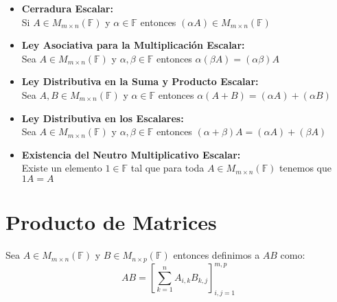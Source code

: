 \documentclass[12pt]{report}                                    %
\newcommand{\Brackets}[1]{\left[ #1 \right]}                    %
\begin{document}
                \begin{itemize}

                    \item \textbf{Cerradura Escalar:}\\
                        Si $A\in M_{m \times n}(\mathbb{F})$ y $\alpha \in \mathbb{F}$ entonces 
                        $(\alpha A) \in M_{m \times n}(\mathbb{F})$

                    \item \textbf{Ley Asociativa para la Multiplicación Escalar:}\\
                        Sea $A \in M_{m \times n}(\mathbb{F})$ y $\alpha, \beta \in \mathbb{F}$
                        entonces $\alpha(\beta A) = (\alpha \beta)A$

                    \item \textbf{Ley Distributiva en la Suma y Producto Escalar:}\\
                        Sea $A, B \in M_{m \times n}(\mathbb{F})$ y $\alpha \in \mathbb{F}$
                        entonces $\alpha(A + B) = (\alpha A) + (\alpha B)$

                    \item \textbf{Ley Distributiva en los Escalares:}\\
                        Sea $A \in M_{m \times n}(\mathbb{F})$ y $\alpha, \beta \in \mathbb{F}$
                        entonces $(\alpha + \beta)A = (\alpha A) + (\beta A)$

                    \item \textbf{Existencia del Neutro Multiplicativo Escalar:}\\
                        Existe un elemento $1 \in \mathbb{F}$ tal que para toda
                            $A \in M_{m \times n}(\mathbb{F})$ tenemos que $1A = A$

                \end{itemize}




        \clearpage
        \section{Producto de Matrices}

            Sea $A \in M_{m \times n}(\mathbb{F})$ y $B \in M_{n \times p}(\mathbb{F})$ entonces 
            definimos a $AB$ como:
            \begin{equation}
                AB = \Brackets{\sum_{k=1}^{n} A_{i, k}B_{k, j} }_{i, j = 1}^{m, p}
            \end{equation}
\end{document}
